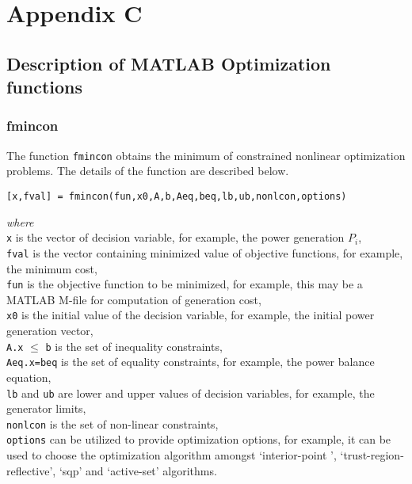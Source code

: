 \chapter{Appendix C}

\section*{Description of MATLAB Optimization functions}

\subsection*{fmincon}
The function \verb|fmincon| obtains the minimum of constrained nonlinear optimization problems. The details of the function are described below. 
\begin{verbatim}
[x,fval] = fmincon(fun,x0,A,b,Aeq,beq,lb,ub,nonlcon,options)
\end{verbatim}
\textit{where } \\ 
\verb|x| is the vector of decision variable, for example, the power generation $P_i$, \\
\verb|fval| is the vector containing minimized value of objective functions, for example, the minimum cost, \\
\verb|fun| is the objective function to be minimized, for example, this may be a MATLAB M-file for computation of generation cost, \\
\verb|x0| is the initial value of the decision variable, for example, the initial power generation vector,\\
\verb|A.x| $\leq$ \verb|b| is the set of inequality constraints,\\
\verb|Aeq.x=beq| is the set of equality constraints, for example, the power balance equation,\\
\verb|lb| and \verb|ub| are lower and upper values of decision variables, for example, the generator limits,\\
\verb|nonlcon| is the set of non-linear constraints,\\
\verb|options| can be utilized to provide optimization options, for example, it can be used to choose the optimization algorithm amongst `interior-point ', `trust-region-reflective', `sqp' and `active-set' algorithms.

